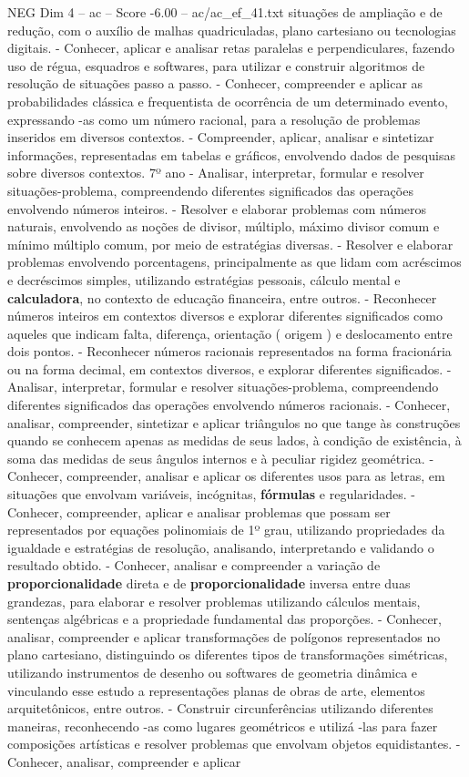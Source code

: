 \begin{textsample}{NEG Dim 4 – ac – Score -6.00 – ac/ac\_ef\_41.txt}
situações de ampliação e de redução, com o auxílio de malhas quadriculadas, plano cartesiano ou tecnologias digitais. - Conhecer, aplicar e analisar retas paralelas e perpendiculares, fazendo uso de régua, esquadros e softwares, para utilizar e construir algoritmos de resolução de situações passo a passo. - Conhecer, compreender e aplicar as probabilidades clássica e frequentista de ocorrência de um determinado evento, expressando -as como um número racional, para a resolução de problemas inseridos em diversos contextos. - Compreender, aplicar, analisar e sintetizar informações, representadas em tabelas e gráficos, envolvendo dados de pesquisas sobre diversos contextos. 7º ano - Analisar, interpretar, formular e resolver situações-problema, compreendendo diferentes significados das operações envolvendo números inteiros. - Resolver e elaborar problemas com números naturais, envolvendo as noções de divisor, múltiplo, máximo divisor comum e mínimo múltiplo comum, por meio de estratégias diversas. - Resolver e elaborar problemas envolvendo porcentagens, principalmente as que lidam com acréscimos e decréscimos simples, utilizando estratégias pessoais, cálculo mental e \textbf{calculadora}, no contexto de educação financeira, entre outros. - Reconhecer números inteiros em contextos diversos e explorar diferentes significados como aqueles que indicam falta, diferença, orientação ( origem ) e deslocamento entre dois pontos. - Reconhecer números racionais representados na forma fracionária ou na forma decimal, em contextos diversos, e explorar diferentes significados. - Analisar, interpretar, formular e resolver situações-problema, compreendendo diferentes significados das operações envolvendo números racionais. - Conhecer, analisar, compreender, sintetizar e aplicar triângulos no que tange às construções quando se conhecem apenas as medidas de seus lados, à condição de existência, à soma das medidas de seus ângulos internos e à peculiar rigidez geométrica. - Conhecer, compreender, analisar e aplicar os diferentes usos para as letras, em situações que envolvam variáveis, incógnitas, \textbf{fórmulas} e regularidades. - Conhecer, compreender, aplicar e analisar problemas que possam ser representados por equações polinomiais de 1º grau, utilizando propriedades da igualdade e estratégias de resolução, analisando, interpretando e validando o resultado obtido. - Conhecer, analisar e compreender a variação de \textbf{proporcionalidade} direta e de \textbf{proporcionalidade} inversa entre duas grandezas, para elaborar e resolver problemas utilizando cálculos mentais, sentenças algébricas e a propriedade fundamental das proporções. - Conhecer, analisar, compreender e aplicar transformações de polígonos representados no plano cartesiano, distinguindo os diferentes tipos de transformações simétricas, utilizando instrumentos de desenho ou softwares de geometria dinâmica e vinculando esse estudo a representações planas de obras de arte, elementos arquitetônicos, entre outros. - Construir circunferências utilizando diferentes maneiras, reconhecendo -as como lugares geométricos e utilizá -las para fazer composições artísticas e resolver problemas que envolvam objetos equidistantes. - Conhecer, analisar, compreender e aplicar 
\end{textsample}
